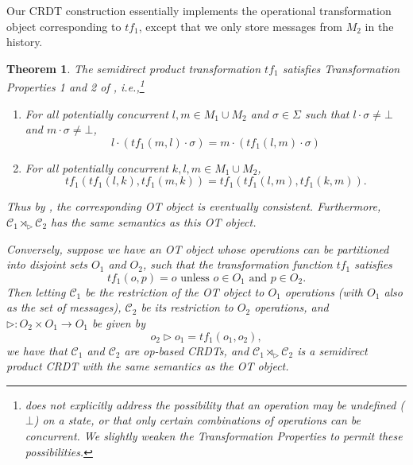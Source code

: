 \documentclass[acmsmall,nonacm,12pt]{acmart}
\newcommand{\mc}[1]{\ensuremath{\mathcal{#1}}}
\newcommand{\ra}{\rightarrow}
\newcommand{\act}{\triangleright}
\theoremstyle{plain}
\newtheorem{mythm}{Theorem}[section]
\theoremstyle{definition}
\begin{document}
Our CRDT construction essentially implements the operational transformation object corresponding to $tf_1$, except that we only store messages from $M_2$ in the history.
\begin{mythm}
\label{thm:ot}
The semidirect product transformation $tf_1$ satisfies Transformation Properties 1 and 2 of \cite{ot_ressel}, i.e.,\footnote{\cite{ot_ressel} does not explicitly address the possibility that an operation may be undefined ($\bot$) on a state, or that only certain combinations of operations can be concurrent.  We slightly weaken the Transformation Properties to permit these possibilities.}
\begin{enumerate}[1.]
  \item For all potentially concurrent $l, m \in M_1 \cup M_2$ and $\sigma \in \Sigma$ such that $l \cdot \sigma \neq \bot$ and $m \cdot \sigma \neq \bot$, $$l \cdot (tf_1(m, l) \cdot \sigma) = m \cdot (tf_1(l, m) \cdot \sigma)$$
  \item For all potentially concurrent $k, l, m \in M_1 \cup M_2$, $$tf_1(tf_1(l, k), tf_1(m, k)) = tf_1(tf_1(l, m), tf_1(k, m)).$$
\end{enumerate}
Thus by \cite[Theorem 1]{ot_ressel}, the corresponding OT object is eventually consistent.  Furthermore, $\mc{C}_1 \rtimes_\act \mc{C}_2$ has the same semantics as this OT object.

Conversely, suppose we have an OT object whose operations can be partitioned into disjoint sets $O_1$ and $O_2$, such that the transformation function $tf_1$ satisfies $$\mbox{$tf_1(o, p) = o$ unless $o \in O_1$ and $p \in O_2$.}$$  Then letting $\mc{C}_1$ be the restriction of the OT object to $O_1$ operations (with $O_1$ also as the set of messages), $\mc{C}_2$ be its restriction to $O_2$ operations, and $\act: O_2 \times O_1 \ra O_1$ be given by
\[
o_2 \act o_1 = tf_1(o_1, o_2),
\]
we have that $\mc{C}_1$ and $\mc{C}_2$ are op-based CRDTs, and $\mc{C}_1 \rtimes_\act \mc{C}_2$ is a semidirect product CRDT with the same semantics as the OT object.
\end{mythm}
\end{document}
